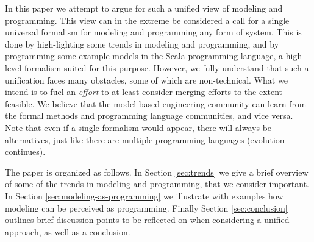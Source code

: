 In this paper we attempt to argue for such a unified view 
of modeling and programming. This view can in the extreme be 
considered a call
for a single universal formalism for modeling and programming any
form of system. This is done by high-lighting some trends in 
modeling and programming, and by programming some example
models in the Scala programming language, a high-level formalism
suited for this purpose.
However, we fully understand that such a unification faces many
obstacles, some of which are non-technical. 
What we intend is to fuel an {\em effort} to at least consider
merging efforts to the extent feasible. We believe that the model-based
engineering community can learn from the formal methods and 
programming language communities, and vice versa. Note that even if a single
formalism would appear, there will always be alternatives, just like
there are multiple programming languages (evolution continues). 

The paper is organized as follows.
In Section \ref{sec:trends} we give a brief overview of some 
of the trends in modeling and programming, that we consider important. 
In Section \ref{sec:modeling-as-programming} we illustrate with examples how modeling can be perceived as programming. 
Finally Section \ref{sec:conclusion} outlines
brief discussion points to be reflected on
when considering a unified approach, as well
as a conclusion.
